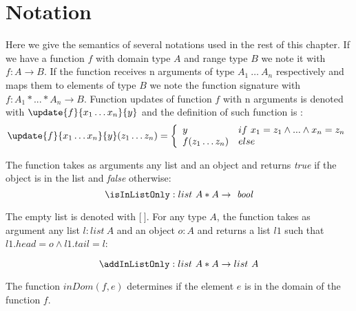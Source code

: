 
 \section{Notation}\label{notation}
 Here we give the semantics of several notations used in the rest of this chapter.
 If we have a function $f$ with  domain type  $A$ and range type $B$
 we note it with $f : A \rightarrow B$. If the function receives n arguments of type $A_1 \ \ldots \ A_n$ respectively
 and maps them to elements of type $B$
 we note the function signature with $f : A_1 * ...*A_n \rightarrow B$.   
 Function updates of function $f$ with n arguments is denoted with $ \update{f}{x_1 \ldots x_n}{y} $ and the definition of such function is :
 $$  \update{f}{x_1 \ldots x_n }{y}(z_1 \ldots z_n) = 
    \left\{\begin{array}{ll}
                  y & if \ x_1 = z_1 \wedge ...\wedge x_n = z_n \\
		  f(z_1 \ldots z_n ) & else
           \end{array}\right.$$
 
 The function \isInListOnly  takes as arguments any list and an object and  returns \textit{true} if the object is in the 
 list and \textit{false} otherwise:
 $$ \isInListOnly : list \ A * A \rightarrow \mbox{ \rm \textit{bool}}$$
 

The empty list is denoted with $\lbrack \ \rbrack$. For any type $A$, the function \addInListOnly takes as argument any list $l: list \ A$ and an object 
$o: A$ and returns a list $l1 $ such that $l1.head = o \wedge l1.tail = l$: 
 
$$ \addInListOnly : list \ A * A \rightarrow  list \ A $$

The function $\textit{inDom}(f, e )$ determines if the element $e$ is in the domain of the function $f$.
